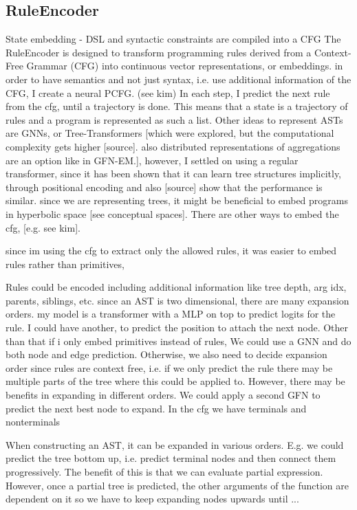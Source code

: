 \subsection{RuleEncoder}
State embedding
- DSL and syntactic constraints are compiled into a CFG
The RuleEncoder is designed to transform programming rules derived from a Context-Free Grammar (CFG) into continuous vector representations, or embeddings.
in order to have semantics and not just syntax, i.e. use additional information of the CFG, I create a neural PCFG. (see kim)
In each step, I predict the next rule from the cfg, until a trajectory is done. This means that a state is a trajectory of rules and a program is represented as such a list.
Other ideas to represent ASTs are GNNs, or Tree-Transformers [which were explored, but the computational complexity gets higher [source]. also distributed representations of aggregations are an option like in GFN-EM.], however, I settled on using a regular transformer, since it has been shown that it can learn tree structures implicitly, through positional encoding and also [source] show that the performance is similar.
since we are representing trees, it might be beneficial to embed programs in hyperbolic space [see conceptual spaces]. 
There are other ways to embed the cfg, [e.g. see kim].


since im using the cfg to extract only the allowed rules, it was easier to embed rules rather than primitives, 

Rules could be encoded including additional information like tree depth, arg idx, parents, siblings, etc. 
since an AST is two dimensional, there are many expansion orders. 
my model is a transformer with a MLP on top to predict logits for the rule. I could have another, to predict the position to attach the next node. Other than that if i only embed primitives instead of rules, 
We could use a GNN and do both node and edge prediction. 
Otherwise, we also need to decide expansion order since rules are context free, i.e. if we only predict the rule there may be multiple parts of the tree where this could be applied to. However, there may be benefits in expanding in different orders. We could apply a second GFN to predict the next best node to expand.
In the cfg we have terminals and nonterminals

When constructing an AST, it can be expanded in various orders.
E.g. we could predict the tree bottom up, i.e. predict terminal nodes and then connect them progressively. The benefit of this is that we can evaluate partial expression. However, once a partial tree is predicted, the other arguments of the function are dependent on it so we have to keep expanding nodes upwards until ...

